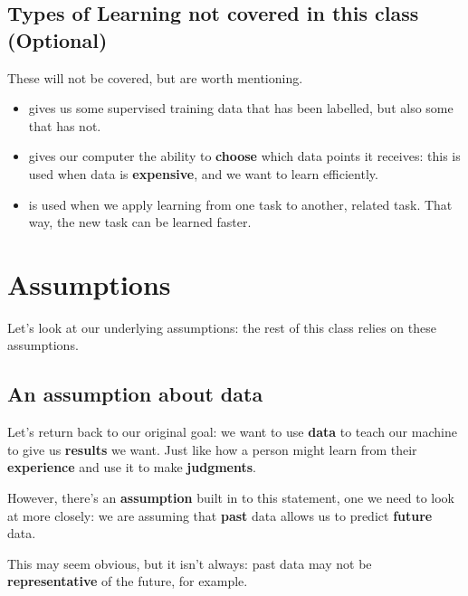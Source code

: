     \subsection{Types of Learning not covered in this class (Optional)}
    
        These will not be covered, but are worth mentioning.
        
        \begin{itemize}
            \item {} gives us some supervised training data that has been labelled, but also some that has not.
            
            \item {} gives our computer the ability to \textbf{choose} which data points it receives: this is used when data is \textbf{expensive}, and we want to learn efficiently.
            
            \item {} is used when we apply learning from one task to another, related task. That way, the new task can be learned faster.
        \end{itemize}

\pagebreak

\section{Assumptions}      

    Let's look at our underlying assumptions: the rest of this class relies on these assumptions.
    
    \subsection{An assumption about data}
        
        Let's return back to our original goal: we want to use \textbf{data} to teach our machine to give us \textbf{results} we want. Just like how a person might learn from their \textbf{experience} and use it to make \textbf{judgments}.
        
        However, there's an \textbf{assumption} built in to this statement, one we need to look at more closely: we are assuming that \textbf{past} data allows us to predict \textbf{future} data. 
        
        This may seem obvious, but it isn't always: past data may not be \textbf{representative} of the future, for example.
        
